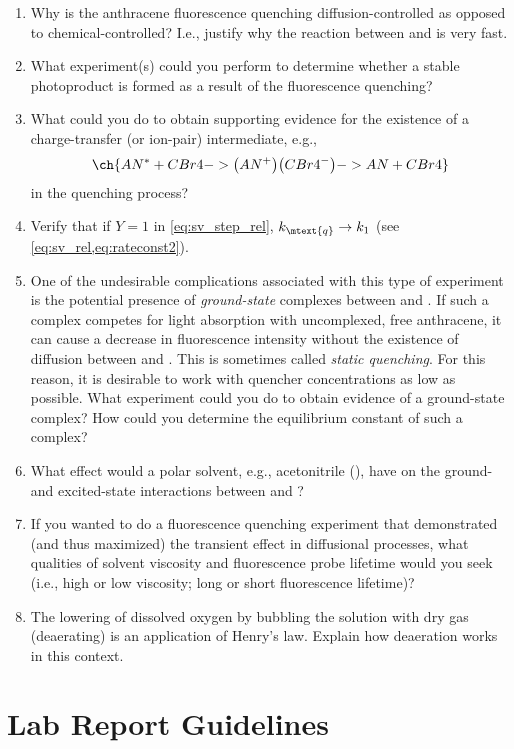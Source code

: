 \begin{enumerate}
	\item Why is the anthracene fluorescence quenching diffusion-controlled as opposed to chemical-controlled? 
	I.e., justify why the reaction between  and  is very fast.
	\item What experiment(s) could you perform to determine whether a stable photoproduct is formed as a result of the fluorescence quenching?
	\item What could you do to obtain supporting evidence for the existence of a charge-transfer (or ion-pair) intermediate, e.g.,
	\[
		\ch{AN^* + CBr4 -> \big(AN^+\big)\big(CBr4^-\big) -> AN + CBr4}
	\]
	in the quenching process?
	\item Verify that if \( Y = 1 \) in \cref{eq:sv_step_rel}, \( k_\mtext{q} \rightarrow k_1 \) (see \cref{eq:sv_rel,eq:rateconst2}).
	\item One of the undesirable complications associated with this type of experiment is the potential presence of \emph{ground-state} complexes between  and . 
	If such a complex competes for light absorption with uncomplexed, free anthracene, it can cause a decrease in fluorescence intensity without the existence of diffusion between  and . 
	This is sometimes called \emph{static quenching}. 
	For this reason, it is desirable to work with quencher concentrations as low as possible. 
	What experiment could you do to obtain evidence of a ground-state complex? 
	How could you determine the equilibrium constant of such a complex?
	\item What effect would a polar solvent, e.g., acetonitrile (), have on the ground- and excited-state interactions between  and ?
	\item If you wanted to do a fluorescence quenching experiment that demonstrated (and thus maximized) the transient effect in diffusional processes, what qualities of solvent viscosity and fluorescence probe lifetime would you seek (i.e., high or low viscosity; long or short fluorescence lifetime)?
	\item The lowering of dissolved oxygen by bubbling the solution with dry  gas (deaerating) is an application of Henry's law. 
	Explain how deaeration works in this context.
\end{enumerate}

\section{Lab Report Guidelines} %
\label{sec:lab_report_guidelines}

